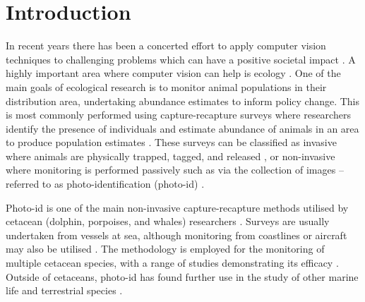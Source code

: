 \chapter{Introduction}\label{ch:intro}

In recent years there has been a concerted effort to apply computer vision techniques to challenging problems which can have a positive societal impact \cite{zhang_unsupervised_2022, jackson_phenotypic_2019, stankiewicz_segmentation_2021, ghosh_facilitating_2022, robin_learning_2022, nasir_dwelling_2022}. A highly important area where computer vision can help is ecology \cite{weinstein_computer_2018}. One of the main goals of ecological research is to monitor animal populations in their distribution area, undertaking abundance estimates to inform policy change. This is most commonly performed using capture-recapture surveys where researchers identify the presence of individuals and estimate abundance of animals in an area to produce population estimates \cite{constantine_abundance_2012, bigg_assessment_1982, sharpe_indian_2019, van_bressem_visual_2018, arso_civil_changing_2019, cheney_long-term_2014}. These surveys can be classified as invasive where animals are physically trapped, tagged, and released \cite{norris_tagging_1970, hobbs_bowhead_1982, andrews_best_2019}, or non-invasive where monitoring is performed passively such as via the collection of images -- referred to as photo-identification (photo-id) \cite{vanbressem_visual_2018, urian_recommendations_2015, reisser_photographic_2008, langtimm_survival_2004, holmberg_estimating_2009}.

Photo-id is one of the main non-invasive capture-recapture methods utilised by cetacean (dolphin, porpoises, and whales) researchers \cite{hammond_individual_1990, evans_monitoring_2004}. Surveys are usually undertaken from vessels at sea, although monitoring from coastlines or aircraft may also be utilised \cite{payne_long_1986, forney_seasonal_1998, wursig_methods_1990}. The methodology is employed for the monitoring of multiple cetacean species, with a range of studies demonstrating its efficacy \cite{sharpe_indian_2019, miragliuolo_rissos_2004, feyrer_origin_2021, bigg_assessment_1982}. Outside of cetaceans, photo-id has found further use in the study of other marine life \cite{holmberg_estimating_2009, reisser_photographic_2008} and terrestrial species \cite{goswami_application_2007, clapham_automated_2020}.

